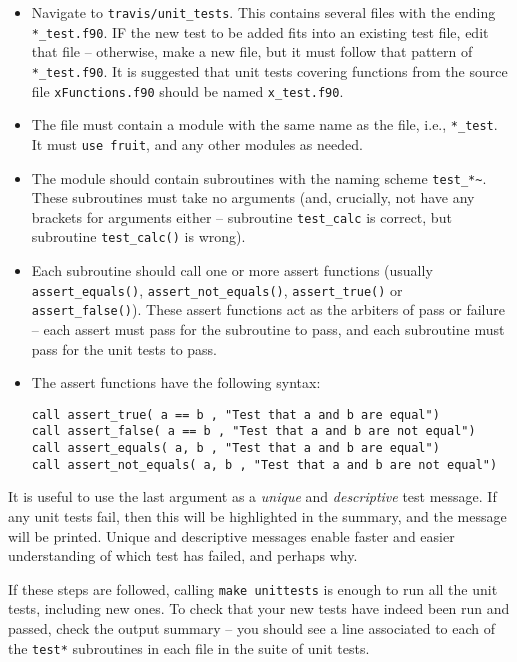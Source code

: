 \begin{itemize}
\item Navigate to \texttt{travis/unit\_tests}. This contains several
  files with the ending \texttt{*\_test.f90}. IF the new test to be
  added fits into an existing test file, edit that file -- otherwise,
  make a new file, but it must follow that pattern of
  \texttt{*\_test.f90}. It is suggested that unit tests covering
  functions from the source file \texttt{xFunctions.f90} should be
  named \texttt{x\_test.f90}.
\item The file must contain a module with the same name as the file,
  i.e., \texttt{*\_test}. It must \texttt{use\ fruit}, and any other
  modules as needed.
\item The module should contain subroutines with the naming scheme
  \texttt{test\_*\textasciitilde{}}. These subroutines must take no
  arguments (and, crucially, not have any brackets for arguments
  either -- subroutine \texttt{test\_calc} is correct, but subroutine
  \texttt{test\_calc()} is wrong).
\item Each subroutine should call one or more assert functions
  (usually \texttt{assert\_equals()}, \texttt{assert\_not\_equals()},
  \texttt{assert\_true()} or \texttt{assert\_false()}). These assert
  functions act as the arbiters of pass or failure -- each assert must
  pass for the subroutine to pass, and each subroutine must pass for
  the unit tests to pass.
\item The assert functions have the following syntax:

\begin{verbatim}
call assert_true( a == b , "Test that a and b are equal")
call assert_false( a == b , "Test that a and b are not equal")
call assert_equals( a, b , "Test that a and b are equal")
call assert_not_equals( a, b , "Test that a and b are not equal")
\end{verbatim}

\end{itemize}

It is useful to use the last argument as a \emph{unique} and
\emph{descriptive} test message. If any unit tests fail, then this
will be highlighted in the summary, and the message will be
printed. Unique and descriptive messages enable faster and easier
understanding of which test has failed, and perhaps why.

If these steps are followed, calling \texttt{make\ unittests} is
enough to run all the unit tests, including new ones. To check that
your new tests have indeed been run and passed, check the output
summary -- you should see a line associated to each of the
\texttt{test*} subroutines in each file in the suite of unit tests.

